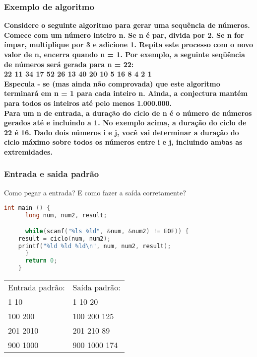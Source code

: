 \begin{frame}
  \frametitle{Exemplo de algoritmo}
  \textbf{\small Considere o seguinte algoritmo para gerar uma sequência de números. Comece com um número inteiro n. Se n é par, divida por 2. Se n for ímpar, multiplique por 3 e adicione 1. Repita este processo com o novo valor de n, encerra quando n = 1. Por exemplo, a seguinte seqüência de números será gerada para n = 22:\\22 11 34 17 52 26 13 40 20 10 5 16 8 4 2 1\\}
  \textbf{\small Especula - se (mas ainda não comprovada) que este algoritmo terminará em n = 1 para cada inteiro n. Ainda, a conjectura mantém para todos os inteiros até pelo menos 1.000.000.\\Para um n de entrada, a duração do ciclo de n é o número de números gerados até e incluindo a 1. No exemplo acima, a duração do ciclo de 22 é 16. Dado dois números i e j, você vai determinar a duração do ciclo máximo sobre todos os números entre i e j, incluindo ambas as extremidades.}
\end{frame}

\begin{frame}[fragile]
  \frametitle{Entrada e saida padrão}
  Como pegar a entrada? E como fazer a saída corretamente?
  \begin{lstlisting}[language=c]
    int main () {
      long num, num2, result;

      while(scanf("%ls %ld", &num, &num2) != EOF)) {
	result = ciclo(num, num2);
	printf("%ld %ld %ld\n", num, num2, result); 
      }
      return 0;
    }
  \end{lstlisting}
  \begin{tabular}{ll}\\
    Entrada padrão: &Saída padrão:\\
    1 10 &1 10 20\\
    100 200 &100 200 125\\
    201 2010 &201 210 89\\
    900 1000 &900 1000 174\\	
  \end{tabular}
\end{frame}

